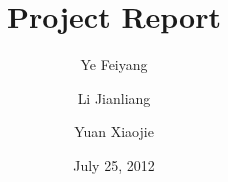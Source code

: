 \documentclass[11pt,oneside,a4paper]{report}
\begin{document}
\title{Project Report}
\author{Ye Feiyang \and Li Jianliang \and Yuan Xiaojie}
\date{July 25, 2012}
\maketitle

\section*{}

\section*{}

\section*{}
\end{document}
